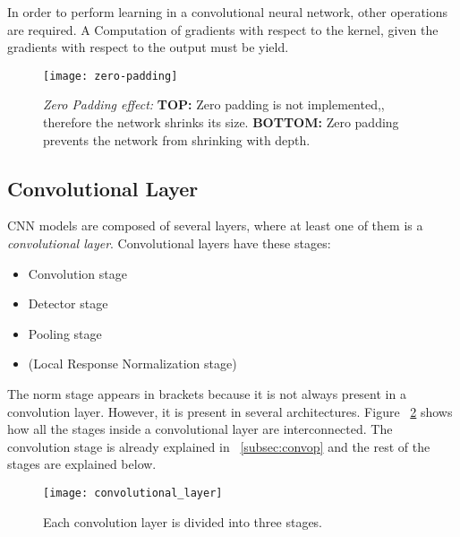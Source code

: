 In order to perform learning in a convolutional neural network, other operations are required. A Computation of gradients with respect to the kernel, given the gradients with respect to the output must be yield. 

\begin{figure}
 \centering
 \texttt{[image: zero-padding]}
 \caption{\textit{Zero Padding effect:} \textbf{TOP:} Zero padding is not implemented,, therefore the network shrinks its size. \textbf{BOTTOM:} Zero padding prevents the network from shrinking with depth.}
 \label{fig:zp}
\end{figure}

\subsection{Convolutional Layer}
\label{sub:convmod}
CNN models are composed of several layers, where at least one of them is a \textit{convolutional layer}. Convolutional layers have these stages:
\begin{itemize}
 \item Convolution stage
 \item Detector stage
 \item Pooling stage
 \item (Local Response Normalization stage)
\end{itemize}

The norm stage appears in brackets because it is not always present in a convolution layer. However, it is present in several architectures. Figure ~\ref{fig:convlay} shows how all the stages inside a convolutional layer are interconnected. The convolution stage is already explained in ~\ref{subsec:convop} and the rest of the stages are explained below.
  
\begin{figure}
 \centering
 \texttt{[image: convolutional\_layer]}
 \caption{Each convolution layer is divided into three stages.}
 \label{fig:convlay}
\end{figure}


